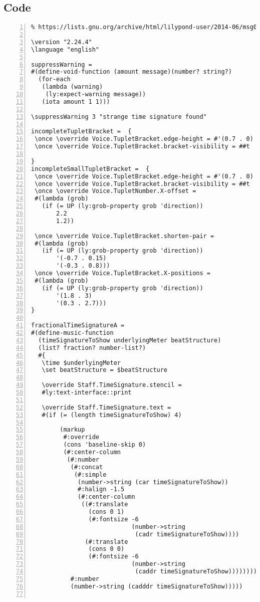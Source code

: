 \subsection{Code}
\begin{Verbatim}[numbers=left,xleftmargin=5mm]
% Inspired by:
% https://lists.gnu.org/archive/html/lilypond-user/2014-06/msg00209.html

\version "2.24.4"
\language "english"

suppressWarning =
#(define-void-function (amount message)(number? string?)
  (for-each
   (lambda (warning)
    (ly:expect-warning message))
   (iota amount 1 1)))

\suppressWarning 3 "strange time signature found"

incompleteTupletBracket =  {
 \once \override Voice.TupletBracket.edge-height = #'(0.7 . 0)
 \once \override Voice.TupletBracket.bracket-visibility = ##t

}
incompleteSmallTupletBracket =  {
 \once \override Voice.TupletBracket.edge-height = #'(0.7 . 0)
 \once \override Voice.TupletBracket.bracket-visibility = ##t
 \once \override Voice.TupletNumber.X-offset =
 #(lambda (grob)
   (if (= UP (ly:grob-property grob 'direction))
       2.2
       1.2))

 \once \override Voice.TupletBracket.shorten-pair =
 #(lambda (grob)
   (if (= UP (ly:grob-property grob 'direction))
       '(-0.7 . 0.15)
       '(-0.3 . 0.8)))
 \once \override Voice.TupletBracket.X-positions =
 #(lambda (grob)
   (if (= UP (ly:grob-property grob 'direction))
       '(1.8 . 3)
       '(0.3 . 2.7)))
}

fractionalTimeSignatureA =
#(define-music-function
  (timeSignatureToShow underlyingMeter beatStructure)
  (list? fraction? number-list?)
  #{
   \time $underlyingMeter
   \set beatStructure = $beatStructure

   \override Staff.TimeSignature.stencil =
   #ly:text-interface::print

   \override Staff.TimeSignature.text =
   #(if (= (length timeSignatureToShow) 4)

        (markup
         #:override
         (cons 'baseline-skip 0)
         (#:center-column
          (#:number
           (#:concat
            (#:simple
             (number->string (car timeSignatureToShow))
             #:halign -1.5
             (#:center-column
              ((#:translate
                (cons 0 1)
                (#:fontsize -6
                            (number->string
                             (cadr timeSignatureToShow))))
               (#:translate
                (cons 0 0)
                (#:fontsize -6
                            (number->string
                             (caddr timeSignatureToShow))))))))
           #:number
           (number->string (cadddr timeSignatureToShow)))))


\end{Verbatim}
